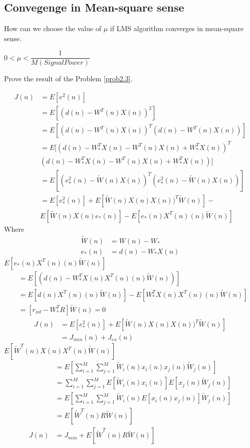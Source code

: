 \documentclass[journal,12pt,twocolumn]{IEEEtran}
\begin{document}
\subsection{Convegenge in Mean-square sense}
\begin{problem}
How can we choose the value of $\mu$ if LMS algorithm converges in mean-square sense. \label{prob2.3}
\end{problem}
\solution
$ 0 < \mu < \dfrac{1}{M(Signal Power)}$
\begin{problem}
Prove the result of the Problem \ref{prob2.3}.
\end{problem}
\solution
\begin{align*}
J(n)&=E[e^{2}(n)]\\
&=E[(d(n) - W^{T}(n) X(n))^{2}]\\
&=E[(d(n) - W^{T}(n)X(n))^{T}(d(n) - W^{T}(n)X(n))]\\
&=E[(d(n) - W_{*}^{T} X(n) - W^{T}(n)X(n) + W_{*}^{T} X(n))^{T}\\&(d(n) - W_{*}^{T} X(n)- W^{T}(n)X(n)+ W_{*}^{T} X(n))]\\
&=E[(e_{*}^{2}(n) - \tilde W(n) X(n))^{T}(e_{*}^{2}(n) - \tilde W(n) X(n))]\\
&=E[e_{*}^{2}(n)] + E[\tilde W(n)X(n) X(n))^{T} \tilde W(n)] -\\ & E[ \tilde W(n)X(n)e_{*}(n)] - E[ e_{*}(n)X^{T}(n)(n)\tilde W(n)]
\end{align*}
 Where  
 \begin{align*}
 \tilde W(n)&= W(n) - W_{*}\\
 e_{*}(n)&= d(n) - W_{*}X(n)
 \end{align*}
 $E[ e_{*}(n)X^{T}(n)(n)\tilde W(n)]$
\begin{align*}
 &= E[(d(n) - W_{*}^{T} X(n)X^{T}(n)(n)\tilde W(n))]\\
&= E[d(n)X^{T}(n)(n)\tilde W(n)] - E[ W_{*}^{T} X(n)X^{T}(n)(n)\tilde W(n)] \\
&= [r_{xd}- W_{*}^{T}R]\tilde W(n) = 0 
\end{align*} 
\begin{align*}
J(n)&=E[e_{*}^{2}(n)] + E[\tilde W(n)X(n) X(n))^{T} \tilde W(n)]\\
&= J_{min}(n) + J_{ex}(n)
\end{align*}
$E[\tilde W^{T}(n)X(n) X^{T}(n) \tilde W(n)]$
\begin{align*}
&=E[\sum_{i=1}^{M} \sum_{j=1}^{M} \tilde W_{i}(n)x_{i}(n) x_{j}(n) \tilde W_j(n)]\\
&=\sum_{i=1}^{M} \sum_{j=1}^{M} E[\tilde W_{i}(n)x_{i}(n)] E[x_{j}(n) \tilde W_j(n)]\\
&=E[\sum_{i=1}^{M} \sum_{j=1}^{M} \tilde W_{i}(n) E[x_{i}(n) x_{j}(n)] \tilde W_j(n)]\\
&=E[\tilde W^{T}(n) R \tilde W(n)]\\
J(n)&=J_{min} + E[\tilde W^{T}(n) R \tilde W(n)]
\end{align*}
\end{document}
